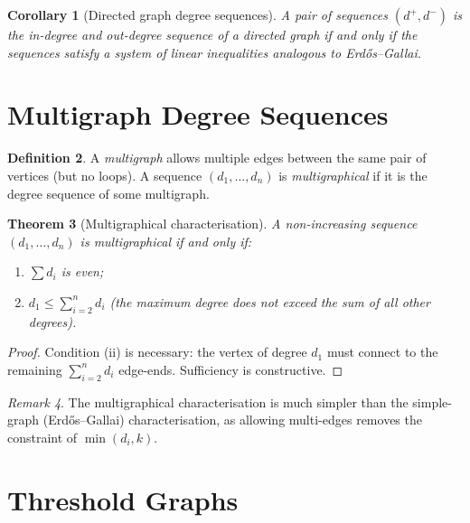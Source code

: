 \documentclass[12pt,a4paper]{amsart}
\newtheorem{theorem}{Theorem}[section]
\newtheorem{corollary}[theorem]{Corollary}
\theoremstyle{definition}
\newtheorem{definition}[theorem]{Definition}
\theoremstyle{remark}
\newtheorem{remark}[theorem]{Remark}
\begin{document}
\begin{corollary}[Directed graph degree sequences]
A pair of sequences $(d^+, d^-)$ is the in-degree and out-degree sequence of
a directed graph if and only if the sequences satisfy a system of linear
inequalities analogous to Erd\H{o}s--Gallai.
\end{corollary}

\section{Multigraph Degree Sequences}

\begin{definition}
A \emph{multigraph} allows multiple edges between the same pair of vertices
(but no loops). A sequence $(d_1, \ldots, d_n)$ is \emph{multigraphical} if
it is the degree sequence of some multigraph.
\end{definition}

\begin{theorem}[Multigraphical characterisation]
A non-increasing sequence $(d_1, \ldots, d_n)$ is multigraphical if and only if:
\begin{enumerate}[label=(\roman*)]
  \item $\sum d_i$ is even;
  \item $d_1 \leq \sum_{i=2}^n d_i$ (the maximum degree does not exceed the
        sum of all other degrees).
\end{enumerate}
\end{theorem}

\begin{proof}
Condition (ii) is necessary: the vertex of degree $d_1$ must connect to the
remaining $\sum_{i=2}^n d_i$ edge-ends. Sufficiency is constructive.
\end{proof}

\begin{remark}
The multigraphical characterisation is much simpler than the simple-graph
(Erd\H{o}s--Gallai) characterisation, as allowing multi-edges removes the
constraint of $\min(d_i, k)$.
\end{remark}

\section{Threshold Graphs}
\end{document}
